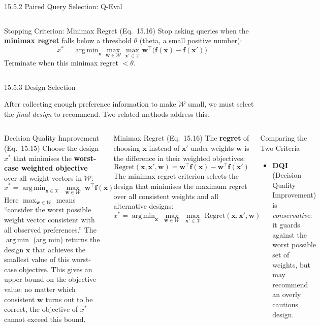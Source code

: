 \documentclass[aspectratio=169,10pt]{beamer}
\newcommand{\bx}{\mathbf{x}}
\newcommand{\bw}{\mathbf{w}}
\newcommand{\bff}{\mathbf{f}}
\DeclareMathOperator*{\argmin}{arg\,min}
\begin{document}
\begin{frame}[allowframebreaks]{15.5.2 Paired Query Selection: Q-Eval}
\begin{columns}
\begin{exampleblock}{Stopping Criterion: Minimax Regret (Eq.\ 15.16)}
  Stop asking queries when the \textbf{minimax regret} falls below a
  threshold $\theta$ (theta, a small positive number):
  \[
    x^* = \argmin_\bx \max_{\bw \in \mathcal{W}} \max_{\bx' \in \mathcal{X}}
    \bw^\top\!\bigl(\bff(\bx) - \bff(\bx')\bigr)
  \]
  Terminate when this minimax regret $< \theta$.
\end{exampleblock}
\end{columns}

\end{frame}

\begin{frame}[allowframebreaks]{15.5.3 Design Selection}

After collecting enough preference information to make $\mathcal{W}$ small,
we must select the \emph{final design} to recommend.  Two related methods
address this.

\begin{columns}
\begin{block}{Decision Quality Improvement (Eq.\ 15.15)}
  Choose the design $x^*$ that minimises the \textbf{worst-case weighted
  objective} over all weight vectors in $\mathcal{W}$:
  \[
    x^* = \argmin_{\bx \in \mathcal{X}}\;
    \max_{\bw \in \mathcal{W}}\; \bw^\top \bff(\bx)
  \]
  Here $\max_{\bw \in \mathcal{W}}$ means ``consider the worst possible
  weight vector consistent with all observed preferences.''  The $\argmin$
  (arg min) returns the design $\bx$ that achieves the smallest value of
  this worst-case objective.  This gives an upper bound on the objective
  value: no matter which consistent $\bw$ turns out to be correct, the
  objective of $x^*$ cannot exceed this bound.
\end{block}

\begin{block}{Minimax Regret (Eq.\ 15.16)}
  The \textbf{regret} of choosing $\bx$ instead of $\bx'$ under weights $\bw$
  is the difference in their weighted objectives:
  \[
    \text{Regret}(\bx, \bx', \bw) =
    \bw^\top \bff(\bx) - \bw^\top \bff(\bx')
  \]
  The minimax regret criterion selects the design that minimises the maximum
  regret over all consistent weights and all alternative designs:
  \[
    x^* = \argmin_\bx\; \max_{\bw \in \mathcal{W}}\;
    \max_{\bx' \in \mathcal{X}}\; \text{Regret}(\bx, \bx', \bw)
  \]
\end{block}

\begin{block}{Comparing the Two Criteria}
  \begin{itemize}
    \item \textbf{DQI} (Decision Quality Improvement) is \emph{conservative}:
      it guards against the worst possible set of weights, but may recommend
      an overly cautious design.


\end{itemize}
\end{block}
\end{columns}
\end{frame}
\end{document}
